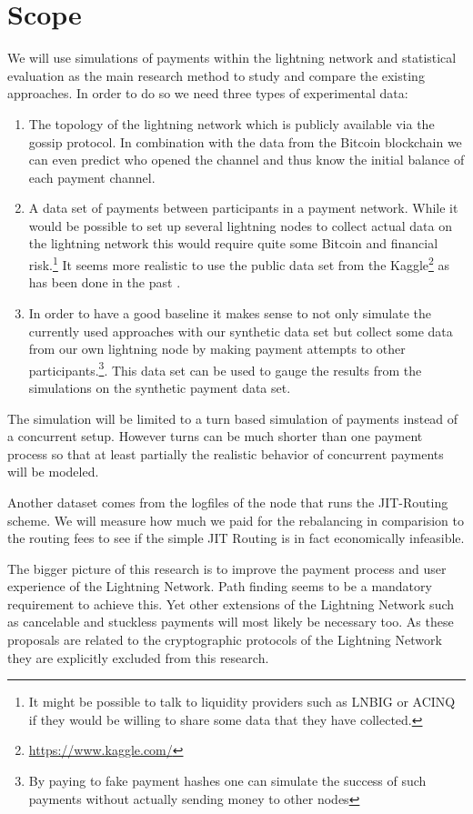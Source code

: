 \documentclass[a4paper]{paper}
\begin{document}
\section{Scope}
We will use simulations of payments within the lightning network and statistical evaluation as the main research method to study and compare the existing approaches.
In order to do so we need three types of experimental data:
\begin{enumerate}
\item The topology of the lightning network which is publicly available via the gossip protocol. In combination with the data from the Bitcoin blockchain we can even predict who opened the channel and thus know the initial balance of each payment channel.
\item A data set of payments between participants in a payment network. While it would be possible to set up several lightning nodes to collect actual data on the lightning network this would require quite some Bitcoin and financial risk.\footnote{It might be possible to talk to liquidity providers such as LNBIG or ACINQ if they would be willing to share some data that they have collected.} It seems more realistic to use the public data set from the Kaggle\footnote{\url{https://www.kaggle.com/}} as has been done in the past \cite{sivaraman2018routing}. 
\item In order to have a good baseline it makes sense to not only simulate the currently used approaches with our synthetic data set but collect some data from our own lightning node by making payment attempts to other participants.\footnote{By paying to fake payment hashes one can simulate the success of such payments without actually sending money to other nodes}. This data set can be used to gauge the results from the simulations on the synthetic payment data set.
\end{enumerate}

The simulation will be limited to a turn based simulation of payments instead of a concurrent setup.
However turns can be much shorter than one payment process so that at least partially the realistic behavior of concurrent payments will be modeled.

Another dataset comes from the logfiles of the node that runs the JIT-Routing scheme.
We will measure how much we paid for the rebalancing in comparision to the routing fees to see if the simple JIT Routing is in fact economically infeasible.

The bigger picture of this research is to improve the payment process and user experience of the Lightning Network.
Path finding seems to be a mandatory requirement to achieve this.
Yet other extensions of the Lightning Network such as cancelable and stuckless payments\cite{gondo2019stucklss} will most likely be necessary too.
As these proposals are related to the cryptographic protocols of the Lightning Network they are explicitly excluded from this research.
\end{document}
